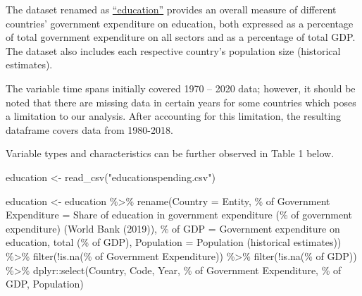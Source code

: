\documentclass[
]{article}
\newenvironment{Shaded}{\begin{snugshade}}{\end{snugshade}}
\newcommand{\AttributeTok}[1]{\textcolor[rgb]{0.77,0.63,0.00}{#1}}
\newcommand{\FunctionTok}[1]{\textcolor[rgb]{0.00,0.00,0.00}{#1}}
\newcommand{\NormalTok}[1]{#1}
\newcommand{\OtherTok}[1]{\textcolor[rgb]{0.56,0.35,0.01}{#1}}
\newcommand{\SpecialCharTok}[1]{\textcolor[rgb]{0.00,0.00,0.00}{#1}}
\newcommand{\StringTok}[1]{\textcolor[rgb]{0.31,0.60,0.02}{#1}}
\begin{document}
The dataset renamed as \href{https://ourworldindata.org/financing-education}{``education''} provides an overall measure of different countries' government expenditure on education, both expressed as a percentage of total government expenditure on all sectors and as a percentage of total GDP. The dataset also includes each respective country's population size (historical estimates).

The variable time spans initially covered 1970 -- 2020 data; however, it should be noted that there are missing data in certain years for some countries which poses a limitation to our analysis. After accounting for this limitation, the resulting dataframe covers data from 1980-2018.

Variable types and characteristics can be further observed in Table 1 below.

\begin{Shaded}
\begin{Highlighting}[]
\NormalTok{education }\OtherTok{\textless{}{-}} \FunctionTok{read\_csv}\NormalTok{(}\StringTok{"educationspending.csv"}\NormalTok{)}
\end{Highlighting}
\end{Shaded}

\begin{Shaded}
\begin{Highlighting}[]
\NormalTok{education }\OtherTok{\textless{}{-}}\NormalTok{ education }\SpecialCharTok{\%\textgreater{}\%} 
  \FunctionTok{rename}\NormalTok{(}\AttributeTok{Country =}\NormalTok{ Entity,}
        \StringTok{\textasciigrave{}}\AttributeTok{\% of Government Expenditure}\StringTok{\textasciigrave{}} \OtherTok{=} \StringTok{\textasciigrave{}}\AttributeTok{Share of education in government expenditure (\% of government expenditure) (World Bank (2019))}\StringTok{\textasciigrave{}}\NormalTok{,}
        \StringTok{\textasciigrave{}}\AttributeTok{\% of GDP}\StringTok{\textasciigrave{}} \OtherTok{=} \StringTok{\textasciigrave{}}\AttributeTok{Government expenditure on education, total (\% of GDP)}\StringTok{\textasciigrave{}}\NormalTok{, }
         \AttributeTok{Population =} \StringTok{\textasciigrave{}}\AttributeTok{Population (historical estimates)}\StringTok{\textasciigrave{}}\NormalTok{) }\SpecialCharTok{\%\textgreater{}\%}
  \FunctionTok{filter}\NormalTok{(}\SpecialCharTok{!}\FunctionTok{is.na}\NormalTok{(}\StringTok{\textasciigrave{}}\AttributeTok{\% of Government Expenditure}\StringTok{\textasciigrave{}}\NormalTok{)) }\SpecialCharTok{\%\textgreater{}\%}
  \FunctionTok{filter}\NormalTok{(}\SpecialCharTok{!}\FunctionTok{is.na}\NormalTok{(}\StringTok{\textasciigrave{}}\AttributeTok{\% of GDP}\StringTok{\textasciigrave{}}\NormalTok{)) }\SpecialCharTok{\%\textgreater{}\%}
\NormalTok{  dplyr}\SpecialCharTok{::}\FunctionTok{select}\NormalTok{(Country, Code, Year, }\StringTok{\textasciigrave{}}\AttributeTok{\% of Government Expenditure}\StringTok{\textasciigrave{}}\NormalTok{, }\StringTok{\textasciigrave{}}\AttributeTok{\% of GDP}\StringTok{\textasciigrave{}}\NormalTok{, Population)}
\end{Highlighting}
\end{Shaded}
\end{document}
